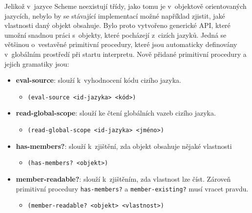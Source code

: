 \documentclass[
  master,
  biblatex,
  figures=true,
  theorems,
  sourcecodes,
  glossaries,
  index
]{kidiplom}
\begin{document}
Jelikož v~jazyce Scheme neexistují třídy, jako tomu je v~objektově orientovaných jazycích, nebylo by se stávající implementací možné například zjistit, jaké vlastnosti daný objekt obsahuje. Bylo proto vytvořeno generické API, které umožní snadnou práci s~objekty, které pocházejí z~cizích jazyků. Jedná se většinou o~vestavěné primitivní procedury, které jsou automaticky definovány v~globálním prostředí při startu interpretu. Nově přidané primitivní procedury a jejich gramatiky jsou:    


\begin{itemize}
    \item \textbf{eval-source}: slouží k~vyhodnocení kódu cizího jazyka. 
    \begin{itemize}
        \item \texttt{(eval-source <id-jazyka> <kód>)}
    \end{itemize}
    
    \item \textbf{read-global-scope}: slouží ke čtení globálních vazeb cizího jazyka.
    \begin{itemize}
        \item \texttt{(read-global-scope <id-jazyka> <jméno>)}
    \end{itemize}
    
    \item \textbf{has-members?}: slouží k~zjištění, zda objekt obsahuje nějaké vlastnosti
    \begin{itemize}
        \item \texttt{(has-members? <objekt>)}
    \end{itemize}
    
    \item \textbf{member-readable?}: slouží k~zjištěním, zda vlastnost lze číst. Zároveň primitivní procedury \texttt{has-members?} a \texttt{member-existing?} musí vracet pravdu.
    \begin{itemize}
        \item \texttt{(member-readable? <objekt> <vlastnost>)} 
    \end{itemize}


\end{itemize}
\end{document}
